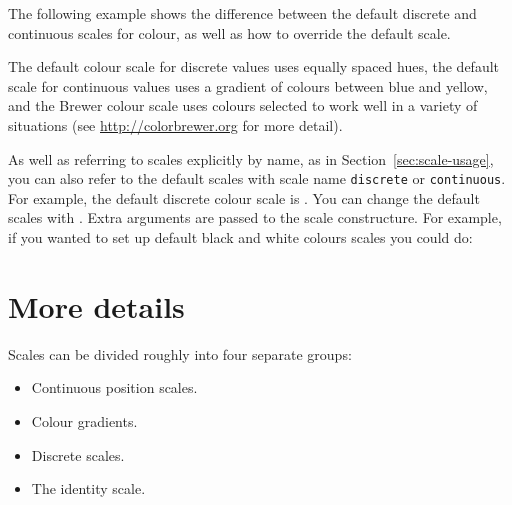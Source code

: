 The following example shows the difference between the default discrete and continuous scales for colour, as well as how to override the default scale.

% 

The default colour scale for discrete values uses equally spaced hues, the default scale for continuous values uses a gradient of colours between blue and yellow, and the Brewer colour scale uses colours selected to work well in a variety of situations (see \url{http://colorbrewer.org} for more detail).

As well as referring to scales explicitly by name, as in Section~\ref{sec:scale-usage}, you can also refer to the default scales with  scale name {\tt discrete} or {\tt continuous}.  For example, the default discrete colour scale is .  You can change the default scales with .  Extra arguments are passed to the scale constructure.  For example, if you wanted to set up default black and white colours scales you could do:

% 



\section{More details}
\label{sec:more-details}

Scales can be divided roughly into four separate groups:

\begin{itemize}
  \item Continuous position scales.
  \item Colour gradients.
  \item Discrete scales.
  \item The identity scale.
\end{itemize}

